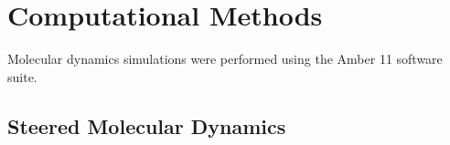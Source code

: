 \section{Computational Methods}

Molecular dynamics simulations were performed using the Amber 11 software suite.\cite{Case2010}

\subsection{Steered Molecular Dynamics}


